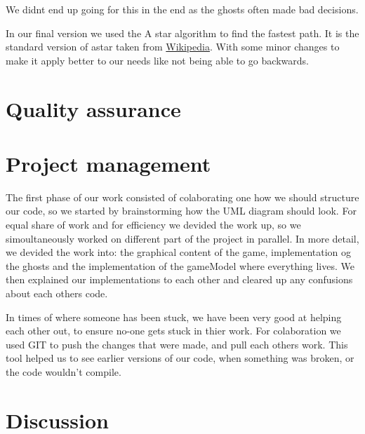 \documentclass[a4paper,12pt]{article}
\begin{document}
We didnt end up going for this in the end as the ghosts often made bad decisions.

In our final version we used the A star algorithm to find the fastest path.
It is the standard version of astar taken from \href{https://en.wikipedia.org/wiki/A*_search_algorithm#Pseudocode}{Wikipedia}.
With some minor changes to make it apply better to our needs like not being able to go backwards.

    
\section{Quality assurance}


\section{Project management}


The first phase of our work consisted of colaborating one how we should structure our code, so we started by brainstorming how the UML diagram should look.
For equal share of work and for efficiency we devided the work up, so we simoultaneously worked on different part of the project in parallel. In more detail, 
we devided the work into: the graphical content of the game, implementation og the ghosts and the implementation of the gameModel where everything lives. We then 
explained our implementations to each other and cleared up any confusions about each others code. 

In times of where someone has been stuck, we have been very good at helping each other out, to ensure no-one gets stuck in thier work. 
For colaboration we used GIT to push the changes that were made, and pull  each others work. This tool helped us to see earlier versions of our code, when something was broken, or the code wouldn't compile. 








\section{Discussion}
\end{document}
